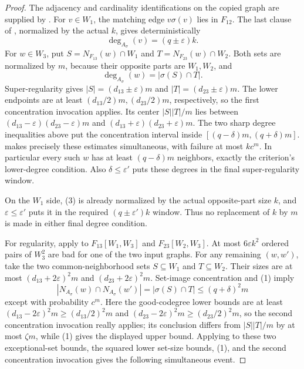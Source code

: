\begin{proof}
The adjacency and cardinality identifications on the copied graph
are supplied by .
For $v\in W_1$, the matching edge $v\sigma(v)$ lies in $F_{12}$.
The last clause of , normalized by the actual $k$, gives deterministically
\[
 \deg_{A_\sigma}(v)=(q\pm\varepsilon)k.
\tag{3}
\]
For $w\in W_3$, put $S=N_{F_{13}}(w)\cap W_1$ and $T=N_{F_{23}}(w)\cap W_2$.  Both sets are normalized by $m$, because their opposite parts are $W_1,W_2$, and
\[
 \deg_{A_\sigma}(w)=|\sigma(S)\cap T|.
\]
Super-regularity gives $|S|=(d_{13}\pm\varepsilon)m$ and
$|T|=(d_{23}\pm\varepsilon)m$. The lower endpoints are at least
$(d_{13}/2)m,(d_{23}/2)m$, respectively, so the first concentration
invocation applies. Its center $|S||T|/m$ lies between
$(d_{13}-\varepsilon)(d_{23}-\varepsilon)m$ and
$(d_{13}+\varepsilon)(d_{23}+\varepsilon)m$.
The two sharp degree inequalities above put the concentration interval
inside $[(q-\delta)m,(q+\delta)m]$.
 makes precisely these
estimates simultaneous, with failure at most $kc^m$.
In particular every such $w$ has at least $(q-\delta)m$ neighbors,
exactly the criterion's lower-degree condition. Also $\delta\leq\varepsilon'$
puts these degrees in the final super-regularity window.

On the $W_1$ side, (3) is already normalized by the actual opposite-part
size $k$, and $\varepsilon\leq\varepsilon'$ puts it in the
required $(q\pm\varepsilon')k$ window.  Thus no replacement of $k$ by $m$
is made in either final degree condition.

For regularity, apply  to $F_{13}[W_1,W_3]$ and $F_{23}[W_2,W_3]$.  At most $6\varepsilon k^2$ ordered pairs of $W_3^2$ are bad for one of the two input graphs.  For any remaining $(w,w')$, take the two common-neighborhood sets $S\subseteq W_1$ and $T\subseteq W_2$.  Their sizes are at most $(d_{13}+2\varepsilon)^2m$ and $(d_{23}+2\varepsilon)^2m$.  Set-image concentration and (1) imply
\[
 |N_{A_\sigma}(w)\cap N_{A_\sigma}(w')|
 =|\sigma(S)\cap T|\leq(q+\delta)^2m
\]
except with probability $c^m$.  Here the good-codegree lower bounds are at
least $(d_{13}-2\varepsilon)^2m\geq(d_{13}/2)^2m$ and
$(d_{23}-2\varepsilon)^2m\geq(d_{23}/2)^2m$, so the second concentration
invocation really applies; its conclusion differs from $|S||T|/m$ by at
most $\zeta m$, while (1) gives the displayed upper bound.
Applying  to these two
exceptional-set bounds, the squared lower set-size bounds, (1), and the
second concentration invocation gives the following simultaneous event.


\end{proof}
